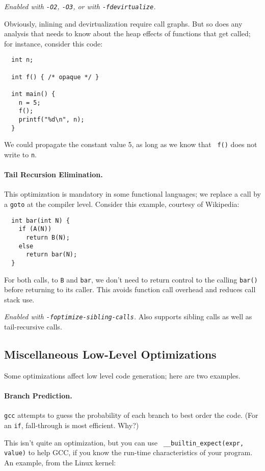 \noindent \emph{Enabled with {\tt -O2}, {\tt -O3}, or with {\tt -fdevirtualize}.}

Obviously, inlining and devirtualization require call graphs. But so
does any analysis that needs to know about the heap effects of
functions that get called; for instance, consider this code:

{\small
\begin{verbatim}
  int n;

  int f() { /* opaque */ }

  int main() {
    n = 5;
    f();
    printf("%d\n", n);
  }
\end{verbatim}
}
We could propagate the constant value 5, as long as we know that {\tt
  f()} does not write to {\tt n}.

\paragraph{Tail Recursion Elimination.} This optimization is mandatory
in some functional languages; we replace a call by a {\tt goto} at the
compiler level. Consider this example, courtesy of Wikipedia:

{\small
\begin{verbatim}
  int bar(int N) {
    if (A(N))
      return B(N);
    else
      return bar(N);
  }
\end{verbatim}
}

For both calls, to {\tt B} and {\tt bar}, we don't need to return control
to the calling {\tt bar()} before returning to its caller. This avoids
function call overhead and reduces call stack use.

\noindent \emph{Enabled with {\tt -foptimize-sibling-calls}.} Also supports
sibling calls as well as tail-recursive calls.

\subsection*{Miscellaneous Low-Level Optimizations}
Some optimizations affect low level code generation; here are two examples.

\paragraph{Branch Prediction.} {\tt gcc} attempts to guess the probability of each branch to 
best order the code. (For an {\tt if}, fall-through is most efficient. Why?)

This isn't quite an optimization, but you can use {\tt
  \_\_builtin\_expect(expr, value)} to help GCC, if you know the
run-time characteristics of your program. An example, from the
  Linux kernel:

